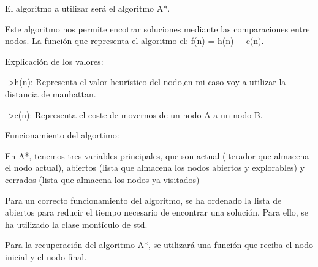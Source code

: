 El algoritmo a utilizar será el algoritmo A*.

Este algoritmo nos permite encotrar soluciones mediante las comparaciones entre nodos.
La función que representa el algoritmo el: f(n) = h(n) + c(n).

Explicación de los valores:

->h(n): Representa el valor heurístico del nodo,en mi caso voy a utilizar la distancia de
manhattan.

->c(n): Representa el coste de movernos de un nodo A a un nodo B.

Funcionamiento del algortimo:

En A*, tenemos tres variables principales, que son actual (iterador que almacena el nodo actual),
abiertos (lista que almacena los nodos abiertos y explorables) y cerrados (lista que almacena los nodos ya visitados)

Para un correcto funcionamiento del algoritmo, se ha ordenado la lista de abiertos para reducir el tiempo necesario de
encontrar una solución.
Para ello, se ha utilizado la clase montículo de std.

Para la recuperación del algoritmo A*, se utilizará una función que reciba el nodo inicial y el nodo final.